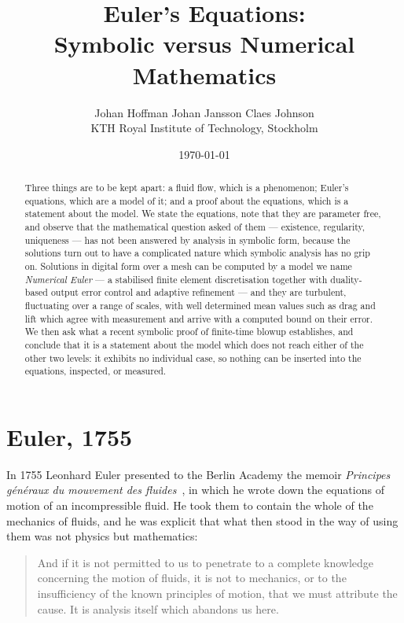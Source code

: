 \documentclass[11pt]{article}
\title{\vspace{-2em}Euler's Equations:\\Symbolic versus Numerical Mathematics}
\author{Johan Hoffman \qquad Johan Jansson \qquad Claes Johnson\\[0.4em]
\small KTH Royal Institute of Technology, Stockholm}
\date{\today}
\begin{document}
\maketitle

\begin{abstract}
\noindent
Three things are to be kept apart: a fluid flow, which is a phenomenon; Euler's equations, which are
a model of it; and a proof about the equations, which is a statement about the model. We state the
equations, note that they are parameter free, and observe that the mathematical question asked of
them --- existence, regularity, uniqueness --- has not been answered by analysis in symbolic form,
because the solutions turn out to have a complicated nature which symbolic analysis has no grip on.
Solutions in digital form over a mesh can be computed by a model we name \emph{Numerical Euler} ---
a stabilised finite element discretisation together with duality-based output error control and
adaptive refinement --- and they are turbulent, fluctuating over a range of scales, with well
determined mean values such as drag and lift which agree with measurement and arrive with a computed
bound on their error. We
then ask what a recent symbolic proof of finite-time blowup establishes, and conclude that it is a
statement about the model which does not reach either of the other two levels: it exhibits no
individual case, so nothing can be inserted into the equations, inspected, or measured.
\end{abstract}

\section{Euler, 1755}\label{sec:eq}

In 1755 Leonhard Euler presented to the Berlin Academy the memoir \emph{Principes g\'en\'eraux du
mouvement des fluides}~\cite{euler1755}, in which he wrote down the equations of motion of an
incompressible fluid. He took them to contain the whole of the mechanics of fluids, and he was
explicit that what then stood in the way of using them was not physics but mathematics:

\begin{quote}\small
And if it is not permitted to us to penetrate to a complete knowledge concerning the motion of
fluids, it is not to mechanics, or to the insufficiency of the known principles of motion, that we
must attribute the cause. It is analysis itself which abandons us here.
\end{quote}
\end{document}
